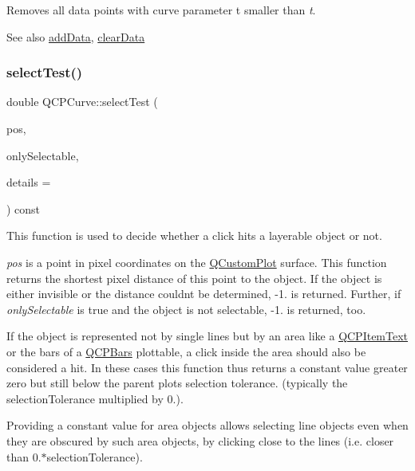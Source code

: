 Removes all data points with curve parameter t smaller than {\itshape t}. \begin{DoxySeeAlso}{See also}
\mbox{\hyperlink{class_q_c_p_curve_a4e24023c3b9ac75440c7a260172c99af}{add\+Data}}, \mbox{\hyperlink{class_q_c_p_curve_ae0462c61dbfbac07db0736ec64110241}{clear\+Data}} 
\end{DoxySeeAlso}
\mbox{\label{class_q_c_p_curve_a87a9fb34a2a48dcae4c1245ada235e7d}} 
\subsubsection{\texorpdfstring{select\+Test()}{selectTest()}}
{\footnotesize\ttfamily double Q\+C\+P\+Curve\+::select\+Test (\begin{DoxyParamCaption}\item[{const Q\+PointF \&}]{pos,  }\item[{bool}]{only\+Selectable,  }\item[{Q\+Variant $\ast$}]{details = {} }\end{DoxyParamCaption}) const\hspace{0.3cm}{\ttfamily [virtual]}}

This function is used to decide whether a click hits a layerable object or not.

{\itshape pos} is a point in pixel coordinates on the \mbox{\hyperlink{class_q_custom_plot}{Q\+Custom\+Plot}} surface. This function returns the shortest pixel distance of this point to the object. If the object is either invisible or the distance couldn\textquotesingle{}t be determined, -\/1. is returned. Further, if {\itshape only\+Selectable} is true and the object is not selectable, -\/1. is returned, too.

If the object is represented not by single lines but by an area like a \mbox{\hyperlink{class_q_c_p_item_text}{Q\+C\+P\+Item\+Text}} or the bars of a \mbox{\hyperlink{class_q_c_p_bars}{Q\+C\+P\+Bars}} plottable, a click inside the area should also be considered a hit. In these cases this function thus returns a constant value greater zero but still below the parent plot\textquotesingle{}s selection tolerance. (typically the selection\+Tolerance multiplied by 0.).

Providing a constant value for area objects allows selecting line objects even when they are obscured by such area objects, by clicking close to the lines (i.\+e. closer than 0.$\ast$selection\+Tolerance).

